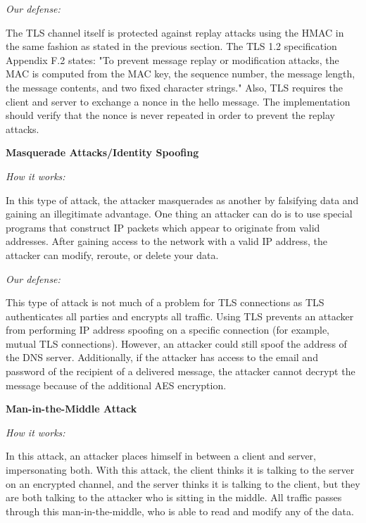 \documentclass[a4paper,twoside,10pt]{report}
\begin{document}
\vspace{2.5mm}
\noindent
\textit{Our defense: }

The TLS channel itself is protected against replay attacks using the HMAC in the same fashion as stated in the previous section. The TLS 1.2 specification Appendix F.2 states: "To prevent message replay or modification attacks, the MAC is computed from the MAC key, the sequence number, the message length, the message contents, and two fixed character strings." Also, TLS requires the client and server to exchange a nonce in the hello message. The implementation should verify that the nonce is never repeated in order to prevent the replay attacks.

\vspace{2.5mm}
\noindent
{\large\textbf{Masquerade Attacks/Identity Spoofing}}

\vspace{1mm}
\noindent
\textit{How it works: }

In this type of attack, the attacker masquerades as another by falsifying data and gaining an illegitimate advantage. One thing an attacker can do is to use special programs that construct IP packets which appear to originate from valid addresses. After gaining access to the network with a valid IP address, the attacker can modify, reroute, or delete your data.

\vspace{2.5mm}
\noindent
\textit{Our defense: }

This type of attack is not much of a problem for TLS connections as TLS authenticates all parties and encrypts all traffic. Using TLS prevents an attacker from performing IP address spoofing on a specific connection (for example, mutual TLS connections). However, an attacker could still spoof the address of the DNS server. Additionally, if the attacker has access to the email and password of the recipient of a delivered message, the attacker cannot decrypt the message because of the additional AES encryption.

\vspace{2.5mm}
\noindent
{\large\textbf{Man-in-the-Middle Attack}}

\vspace{1mm}
\noindent
\textit{How it works: }

In this attack, an attacker places himself in between a client and server, impersonating both. With this attack, the client thinks it is talking to the server on an encrypted channel, and the server thinks it is talking to the client, but they are both talking to the attacker who is sitting in the middle. All traffic passes through this man-in-the-middle, who is able to read and modify any of the data.
\end{document}
